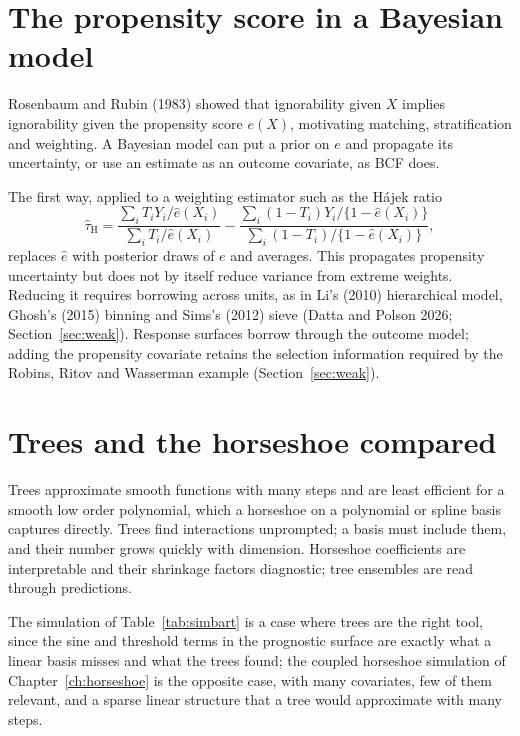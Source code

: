 \section{The propensity score in a Bayesian model}

Rosenbaum and Rubin (1983) showed that ignorability given $X$ implies ignorability given the propensity score $e(X)$, motivating matching, stratification and weighting. A Bayesian model can put a prior on $e$ and propagate its uncertainty, or use an estimate as an outcome covariate, as BCF does.

The first way, applied to a weighting estimator such as the H\'ajek ratio
\[
\hat\tau_{\mathrm{H}} = \frac{\sum_i T_iY_i/\hat e(X_i)}{\sum_i T_i/\hat e(X_i)} - \frac{\sum_i (1 - T_i)Y_i/\{1 - \hat e(X_i)\}}{\sum_i (1 - T_i)/\{1 - \hat e(X_i)\}},
\]
replaces $\hat e$ with posterior draws of $e$ and averages. This propagates propensity uncertainty but does not by itself reduce variance from extreme weights. Reducing it requires borrowing across units, as in Li's (2010) hierarchical model, Ghosh's (2015) binning and Sims's (2012) sieve (Datta and Polson 2026; Section~\ref{sec:weak}). Response surfaces borrow through the outcome model; adding the propensity covariate retains the selection information required by the Robins, Ritov and Wasserman example (Section~\ref{sec:weak}).

\section{Trees and the horseshoe compared}

Trees approximate smooth functions with many steps and are least efficient for a smooth low order polynomial, which a horseshoe on a polynomial or spline basis captures directly. Trees find interactions unprompted; a basis must include them, and their number grows quickly with dimension. Horseshoe coefficients are interpretable and their shrinkage factors diagnostic; tree ensembles are read through predictions.

 The simulation of Table~\ref{tab:simbart} is a case where trees are the right tool, since the sine and threshold terms in the prognostic surface are exactly what a linear basis misses and what the trees found; the coupled horseshoe simulation of Chapter~\ref{ch:horseshoe} is the opposite case, with many covariates, few of them relevant, and a sparse linear structure that a tree would approximate with many steps.

